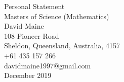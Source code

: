 \begin{titlepage}
    \vspace*{5em}
    \begin{center}
        \huge{Personal Statement} \\[0.2em]
        \LARGE{Masters of Science (Mathematics)} \\[2em]
        \large{
            David Maine\\
            108 Pioneer Road\\ 
            Sheldon, Queensland, Australia, 4157\\
            +61 435 157 266\\
            davidmaine1997@gmail.com\\[2em]
            December 2019
        }
    \end{center}
    \vspace*{\fill}
\end{titlepage}
\restoregeometry